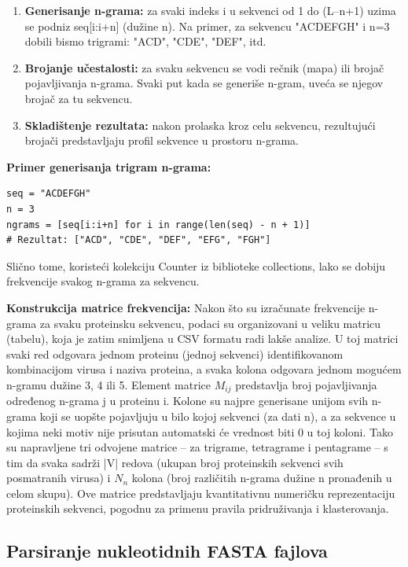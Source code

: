 \documentclass[a4paper,12pt]{article}
\begin{document}
\begin{enumerate}
  \item \textbf{Generisanje n-grama:} za svaki indeks i u sekvenci od 1 do (L–n+1) uzima se podniz seq[i:i+n]
(dužine n). Na primer, za sekvencu "ACDEFGH" i n=3 dobili bismo trigrami: "ACD", "CDE", "DEF",
itd.
  \item \textbf{Brojanje učestalosti:} za svaku sekvencu se vodi rečnik (mapa) ili brojač pojavljivanja n-grama. Svaki
put kada se generiše n-gram, uveća se njegov brojač za tu sekvencu.
  \item \textbf{Skladištenje rezultata:} nakon prolaska kroz celu sekvencu, rezultujući brojači predstavljaju profil
sekvence u prostoru n-grama.
\end{enumerate}

\textbf{Primer generisanja trigram n-grama:}

\begin{lstlisting}
seq = "ACDEFGH"
n = 3
ngrams = [seq[i:i+n] for i in range(len(seq) - n + 1)]
# Rezultat: ["ACD", "CDE", "DEF", "EFG", "FGH"]
\end{lstlisting}

Slično tome, koristeći kolekciju Counter iz biblioteke collections, lako se dobiju frekvencije svakog n-grama
za sekvencu.

\vspace{10pt}
\textbf{Konstrukcija matrice frekvencija:} Nakon što su izračunate frekvencije n-grama za svaku proteinsku
sekvencu, podaci su organizovani u veliku matricu (tabelu), koja je zatim snimljena u CSV formatu radi lakše
analize. U toj matrici svaki red odgovara jednom proteinu (jednoj sekvenci) identifikovanom kombinacijom
virusa i naziva proteina, a svaka kolona odgovara jednom mogućem n-gramu dužine 3, 4 ili 5. Element
matrice $M_{ij}$ predstavlja broj pojavljivanja određenog n-grama j u proteinu i. Kolone su najpre
generisane unijom svih n-grama koji se uopšte pojavljuju u bilo kojoj sekvenci (za dati n), a za sekvence u
kojima neki motiv nije prisutan automatski će vrednost biti 0 u toj koloni. Tako su napravljene tri odvojene
matrice – za trigrame, tetragrame i pentagrame – s tim da svaka sadrži |V| redova (ukupan broj proteinskih
sekvenci svih posmatranih virusa) i $N_{n}$ kolona (broj različitih n-grama dužine n pronađenih u
celom skupu). Ove matrice predstavljaju kvantitativnu numeričku reprezentaciju proteinskih sekvenci,
pogodnu za primenu pravila pridruživanja i klasterovanja.

\subsection{Parsiranje nukleotidnih FASTA fajlova}
\end{document}
